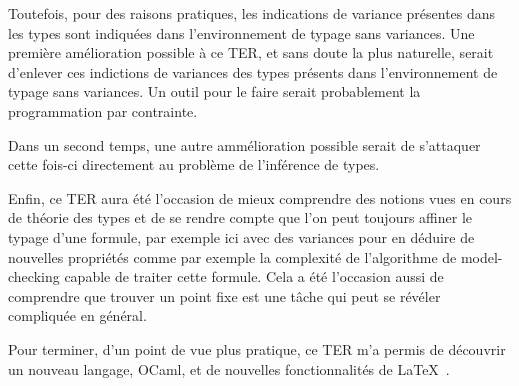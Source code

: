 \documentclass{rapport}
\theoremstyle{plain}
\theoremstyle{remark}
\theoremstyle{definition}
\begin{document}
 Toutefois, pour des raisons pratiques, les indications de variance présentes dans les types sont indiquées dans l'environnement de typage sans variances. Une première amélioration possible à ce TER, et sans doute la plus naturelle, serait d'enlever ces indictions de variances des types présents dans l'environnement de typage sans variances. Un outil pour le faire serait probablement la programmation par contrainte. 

Dans un second temps, une autre ammélioration possible serait de s'attaquer cette fois-ci directement au problème de l'inférence de types. 

Enfin, ce TER aura été l'occasion de mieux comprendre des notions vues en cours de théorie des types et de se rendre compte que l'on peut toujours affiner le typage d'une formule, par exemple ici avec des variances pour en déduire de nouvelles propriétés comme par exemple la complexité de l'algorithme de model-checking capable de traiter cette formule. Cela a été l'occasion aussi de comprendre que trouver un point fixe est une tâche qui peut se révéler compliquée en général. 

Pour terminer, d'un point de vue plus pratique, ce TER m'a permis de découvrir un nouveau langage, OCaml, et de nouvelles fonctionnalités de \LaTeX~.   



\end{document}
